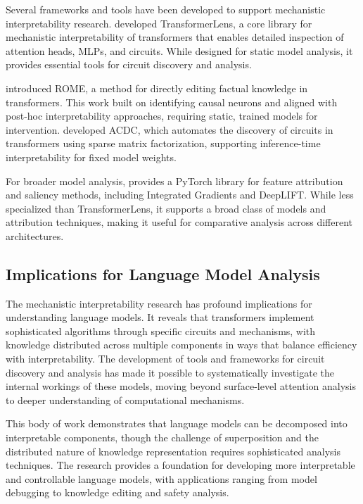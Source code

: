 Several frameworks and tools have been developed to support mechanistic interpretability research. \citet{nanda2022transformerlens} developed TransformerLens, a core library for mechanistic interpretability of transformers that enables detailed inspection of attention heads, MLPs, and circuits. While designed for static model analysis, it provides essential tools for circuit discovery and analysis.

\citet{meng2022locating} introduced ROME, a method for directly editing factual knowledge in transformers. This work built on identifying causal neurons and aligned with post-hoc interpretability approaches, requiring static, trained models for intervention. \citet{conmy2023towards} developed ACDC, which automates the discovery of circuits in transformers using sparse matrix factorization, supporting inference-time interpretability for fixed model weights.

For broader model analysis, \citet{kokhlikyan2020captum} provides a PyTorch library for feature attribution and saliency methods, including Integrated Gradients and DeepLIFT. While less specialized than TransformerLens, it supports a broad class of models and attribution techniques, making it useful for comparative analysis across different architectures.

\subsection{Implications for Language Model Analysis}

The mechanistic interpretability research has profound implications for understanding language models. It reveals that transformers implement sophisticated algorithms through specific circuits and mechanisms, with knowledge distributed across multiple components in ways that balance efficiency with interpretability. The development of tools and frameworks for circuit discovery and analysis has made it possible to systematically investigate the internal workings of these models, moving beyond surface-level attention analysis to deeper understanding of computational mechanisms.

This body of work demonstrates that language models can be decomposed into interpretable components, though the challenge of superposition and the distributed nature of knowledge representation requires sophisticated analysis techniques. The research provides a foundation for developing more interpretable and controllable language models, with applications ranging from model debugging to knowledge editing and safety analysis.

